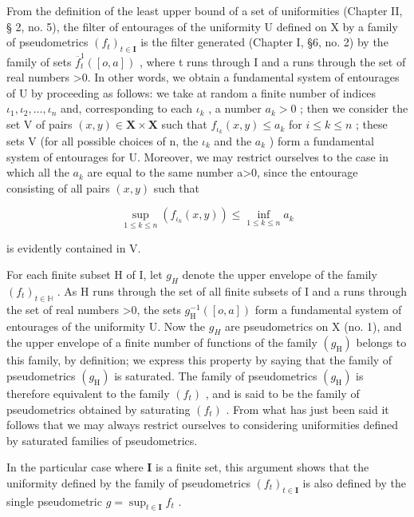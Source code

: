 From the definition of the least upper bound of a set of uniformities (Chapter II, § 2, no. 5), the filter of entourages of the uniformity U defined on X by a family of pseudometrics \((f_{t})_{t\in\mathbf{I}}\) is the filter generated (Chapter I, §6, no. 2) by the family of sets \(\overline{f}_{t}^{1}([o,a])\) , where t runs through I and a runs through the set of real numbers \textgreater0. In other words, we obtain a fundamental system of entourages of U by proceeding as follows: we take at random a finite number of indices \(\iota_{1},\iota_{2},\ldots,\iota_{n}\) and, corresponding to each \(\iota_{k}\) , a number \(a_{k}>0\) ; then we consider the set V of pairs \((x,y)\in\mathbf{X}\times\mathbf{X}\) such that \(f_{\iota_{k}}(x,y)\leqslant a_{k}\) for \(i\leqslant k\leqslant n\) ; these sets V (for all possible choices of n, the \(\iota_{k}\) and the \(a_{k}\) ) form a fundamental system of entourages for U. Moreover, we may restrict ourselves to the case in which all the \(a_{k}\) are equal to the same number a\textgreater0, since the entourage consisting of all pairs \((x,y)\) such that

\[
\sup _ {1 \leqslant k \leqslant n} \left(f _ {\iota_ {k}} (x, y)\right) \leqslant \inf _ {1 \leqslant k \leqslant n} a _ {k}
\]

is evidently contained in V.

For each finite subset H of I, let \(g_{H}\) denote the upper envelope of the family \((f_{t})_{t\in\mathbb{H}}\) . As H runs through the set of all finite subsets of I and a runs through the set of real numbers \textgreater0, the sets \(g_{\mathrm{H}}^{-1}([o,a])\) form a fundamental system of entourages of the uniformity U. Now the \(g_{H}\) are pseudometrics on X (no. 1), and the upper envelope of a finite number of functions of the family \((g_{\mathrm{H}})\) belongs to this family, by definition; we express this property by saying that the family of pseudometrics \((g_{\mathrm{H}})\) is saturated. The family of pseudometrics \((g_{\mathrm{H}})\) is therefore equivalent to the family \((f_{t})\) , and is said to be the family of pseudometrics obtained by saturating \((f_{t})\) . From what has just been said it follows that we may always restrict ourselves to considering uniformities defined by saturated families of pseudometrics.

In the particular case where \(\mathbf{I}\) is a finite set, this argument shows that the uniformity defined by the family of pseudometrics \((f_{t})_{t\in \mathbf{I}}\) is also defined by the single pseudometric \(g = \sup_{t\in \mathbf{I}}f_t\) .

